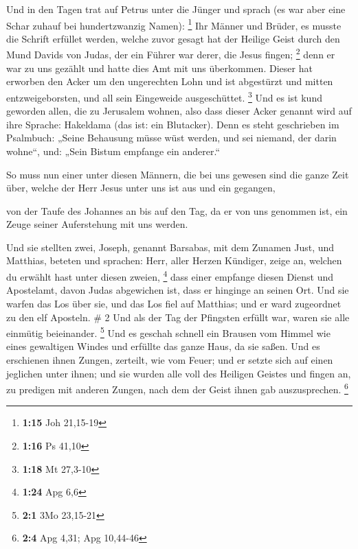  Und in den Tagen trat auf Petrus unter die Jünger und
sprach (es war aber eine Schar zuhauf bei hundertzwanzig Namen):
\footnote{\textbf{1:15} Joh 21,15-19}  Ihr Männer und
Brüder, es musste die Schrift erfüllet werden, welche zuvor gesagt hat
der Heilige Geist durch den Mund Davids von Judas, der ein Führer war
derer, die Jesus fingen; \footnote{\textbf{1:16} Ps 41,10} 
denn er war zu uns gezählt und hatte dies Amt mit uns überkommen.
 Dieser hat erworben den Acker um den ungerechten Lohn und
ist abgestürzt und mitten entzweigeborsten, und all sein Eingeweide
ausgeschüttet. \footnote{\textbf{1:18} Mt 27,3-10}  Und es
ist kund geworden allen, die zu Jerusalem wohnen, also dass dieser Acker
genannt wird auf ihre Sprache: Hakeldama (das ist: ein Blutacker).
 Denn es steht geschrieben im Psalmbuch: „Seine Behausung
müsse wüst werden, und sei niemand, der darin wohne``, und: „Sein Bistum
empfange ein anderer.``

 So muss nun einer unter diesen Männern, die bei uns
gewesen sind die ganze Zeit über, welche der Herr Jesus unter uns ist
aus und ein gegangen,

 von der Taufe des Johannes an bis auf den Tag, da er von
uns genommen ist, ein Zeuge seiner Auferstehung mit uns werden.

 Und sie stellten zwei, Joseph, genannt Barsabas, mit dem
Zunamen Just, und Matthias,  beteten und sprachen: Herr,
aller Herzen Kündiger, zeige an, welchen du erwählt hast unter diesen
zweien, \footnote{\textbf{1:24} Apg 6,6}  dass einer
empfange diesen Dienst und Apostelamt, davon Judas abgewichen ist, dass
er hinginge an seinen Ort.  Und sie warfen das Los über
sie, und das Los fiel auf Matthias; und er ward zugeordnet zu den elf
Aposteln. \# 2  Und als der Tag der Pfingsten erfüllt war,
waren sie alle einmütig beieinander. \footnote{\textbf{2:1} 3Mo 23,15-21}
 Und es geschah schnell ein Brausen vom Himmel wie eines
gewaltigen Windes und erfüllte das ganze Haus, da sie saßen.
 Und es erschienen ihnen Zungen, zerteilt, wie vom Feuer;
und er setzte sich auf einen jeglichen unter ihnen;  und sie
wurden alle voll des Heiligen Geistes und fingen an, zu predigen mit
anderen Zungen, nach dem der Geist ihnen gab auszusprechen. \footnote{\textbf{2:4}
  Apg 4,31; Apg 10,44-46}

